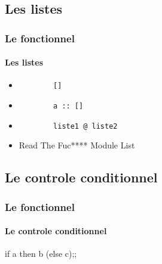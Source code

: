 \subsection{Les listes} 
\begin{frame}[fragile]
	\frametitle{Le fonctionnel}
	\framesubtitle{Les listes}
	\begin{itemize}

	\item 	\begin{lstlisting}
		[]
		\end{lstlisting}

	\item 	\begin{lstlisting}
		a :: []
		\end{lstlisting}

	\item 	\begin{lstlisting}
		liste1 @ liste2
		\end{lstlisting}
		
	\item 	Read The Fuc**** Module List

	\end{itemize}
\end{frame}

   \subsection{Le controle conditionnel}
\begin{frame}
      \frametitle{Le fonctionnel}
      \framesubtitle{Le controle conditionnel}
      \begin{center}
	if a then b (else c);;
  \end{center}
\end{frame}


